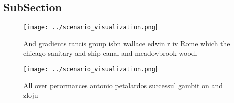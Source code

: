 \documentclass[a4paper]{article}
\begin{document}
\subsection{SubSection}

\begin{figure}
\centering
\texttt{[image: ../scenario\_visualization.png]}
\caption{And gradients rancis group isbn wallace edwin r iv Rome which the chicago sanitary and ship canal and meadowbrook woodl
}
\end{figure}
 
\begin{figure}
\centering
\texttt{[image: ../scenario\_visualization.png]}
\caption{All over perormances antonio petalardos successul gambit on and zloju
}
\end{figure}
 
\end{document}
